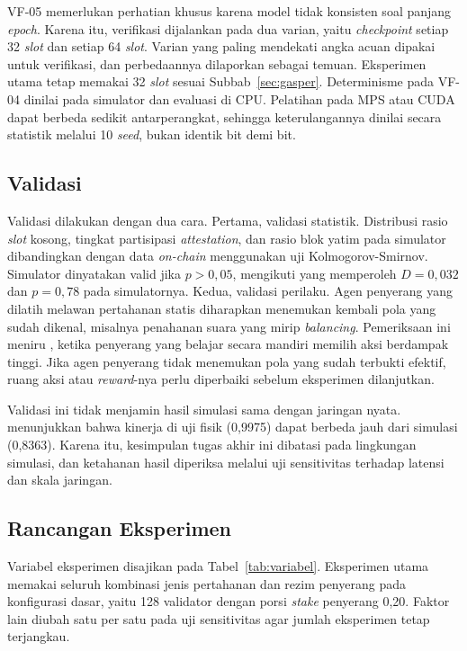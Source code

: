 VF-05 memerlukan perhatian khusus karena model \textcite{laneve2025stochastic} tidak konsisten soal panjang \textit{epoch}. Karena itu, verifikasi dijalankan pada dua varian, yaitu \textit{checkpoint} setiap 32 \textit{slot} dan setiap 64 \textit{slot}. Varian yang paling mendekati angka acuan dipakai untuk verifikasi, dan perbedaannya dilaporkan sebagai temuan. Eksperimen utama tetap memakai 32 \textit{slot} sesuai Subbab~\ref{sec:gasper}. Determinisme pada VF-04 dinilai pada simulator dan evaluasi di CPU. Pelatihan pada MPS atau CUDA dapat berbeda sedikit antarperangkat, sehingga keterulangannya dinilai secara statistik melalui 10 \textit{seed}, bukan identik bit demi bit.

\subsection{Validasi}
\label{subsec:validasi}
Validasi dilakukan dengan dua cara. Pertama, validasi statistik. Distribusi rasio \textit{slot} kosong, tingkat partisipasi \textit{attestation}, dan rasio blok yatim pada simulator dibandingkan dengan data \textit{on-chain} menggunakan uji Kolmogorov-Smirnov. Simulator dinyatakan valid jika $p > 0{,}05$, mengikuti \textcite{skowronski2026adaptive} yang memperoleh $D = 0{,}032$ dan $p = 0{,}78$ pada simulatornya. Kedua, validasi perilaku. Agen penyerang yang dilatih melawan pertahanan statis diharapkan menemukan kembali pola yang sudah dikenal, misalnya penahanan suara yang mirip \textit{balancing}. Pemeriksaan ini meniru \textcite{wushishi2026coadam}, ketika penyerang yang belajar secara mandiri memilih aksi berdampak tinggi. Jika agen penyerang tidak menemukan pola yang sudah terbukti efektif, ruang aksi atau \textit{reward}-nya perlu diperbaiki sebelum eksperimen dilanjutkan.

Validasi ini tidak menjamin hasil simulasi sama dengan jaringan nyata. \textcite{wushishi2026coadam} menunjukkan bahwa kinerja di uji fisik (0,9975) dapat berbeda jauh dari simulasi (0,8363). Karena itu, kesimpulan tugas akhir ini dibatasi pada lingkungan simulasi, dan ketahanan hasil diperiksa melalui uji sensitivitas terhadap latensi dan skala jaringan.

\subsection{Rancangan Eksperimen}
\label{subsec:rancangan_eksperimen}
Variabel eksperimen disajikan pada Tabel~\ref{tab:variabel}. Eksperimen utama memakai seluruh kombinasi jenis pertahanan dan rezim penyerang pada konfigurasi dasar, yaitu 128 validator dengan porsi \textit{stake} penyerang 0,20. Faktor lain diubah satu per satu pada uji sensitivitas agar jumlah eksperimen tetap terjangkau.

